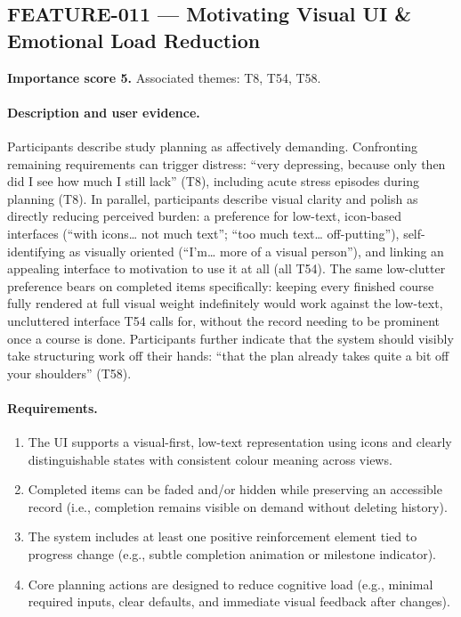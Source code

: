 \subsection{FEATURE-011 --- Motivating Visual UI \& Emotional Load Reduction}
\label{feat:011}
\textbf{Importance score 5.} Associated themes: T8, T54, T58.

\paragraph{Description and user evidence.}
Participants describe study planning as affectively demanding. Confronting remaining requirements can trigger distress: \enquote{very depressing, because only then did I see how much I still lack} (T8), including acute stress episodes during planning (T8). In parallel, participants describe visual clarity and polish as directly reducing perceived burden: a preference for low-text, icon-based interfaces (\enquote{with icons… not much text}; \enquote{too much text… off-putting}), self-identifying as visually oriented (\enquote{I'm… more of a visual person}), and linking an appealing interface to motivation to use it at all (all T54). The same low-clutter preference bears on completed items specifically: keeping every finished course fully rendered at full visual weight indefinitely would work against the low-text, uncluttered interface T54 calls for, without the record needing to be prominent once a course is done. Participants further indicate that the system should visibly take structuring work off their hands: \enquote{that the plan already takes quite a bit off your shoulders} (T58).

\paragraph{Requirements.}
\begin{enumerate}
    \item The UI supports a visual-first, low-text representation using icons and clearly distinguishable states with consistent colour meaning across views.
    \item Completed items can be faded and/or hidden while preserving an accessible record (i.e., completion remains visible on demand without deleting history).
    \item The system includes at least one positive reinforcement element tied to progress change (e.g., subtle completion animation or milestone indicator).
    \item Core planning actions are designed to reduce cognitive load (e.g., minimal required inputs, clear defaults, and immediate visual feedback after changes).
\end{enumerate}

